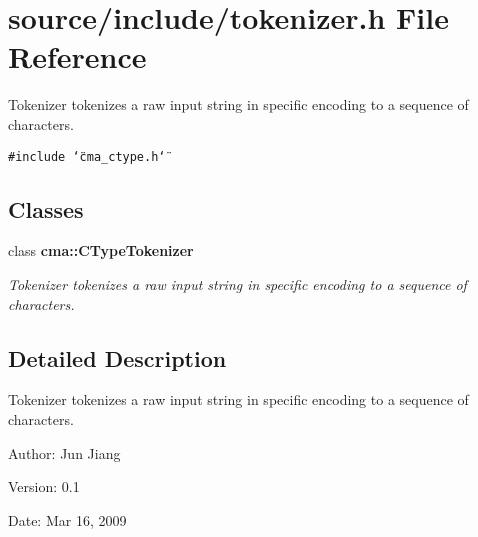 \section{source/include/tokenizer.h File Reference}
\label{tokenizer_8h}
Tokenizer tokenizes a raw input string in specific encoding to a sequence of characters.  


{\tt \#include \char`\"{}cma\_\-ctype.h\char`\"{}}\par
\subsection*{Classes}
\begin{CompactItemize}
\item 
class {\bf cma::CTypeTokenizer}
\begin{CompactList}\small\item\em Tokenizer tokenizes a raw input string in specific encoding to a sequence of characters. \item\end{CompactList}\end{CompactItemize}


\subsection{Detailed Description}
Tokenizer tokenizes a raw input string in specific encoding to a sequence of characters. 

\begin{Desc}
\item[Author:]Jun Jiang \end{Desc}
\begin{Desc}
\item[Version:]0.1 \end{Desc}
\begin{Desc}
\item[Date:]Mar 16, 2009 \end{Desc}
